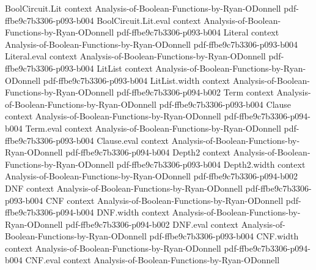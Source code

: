 \begin{lemma}
\leanok
{}
\proofstep
  {BoolCircuit.Lit}
  {context}
  {Analysis-of-Boolean-Functions-by-Ryan-ODonnell}
  {pdf-ffbe9c7b3306-p093-b004}
\proofstep
  {BoolCircuit.Lit.eval}
  {context}
  {Analysis-of-Boolean-Functions-by-Ryan-ODonnell}
  {pdf-ffbe9c7b3306-p093-b004}
\proofstep
  {Literal}
  {context}
  {Analysis-of-Boolean-Functions-by-Ryan-ODonnell}
  {pdf-ffbe9c7b3306-p093-b004}
\proofstep
  {Literal.eval}
  {context}
  {Analysis-of-Boolean-Functions-by-Ryan-ODonnell}
  {pdf-ffbe9c7b3306-p093-b004}
\proofstep
  {LitList}
  {context}
  {Analysis-of-Boolean-Functions-by-Ryan-ODonnell}
  {pdf-ffbe9c7b3306-p093-b004}
\proofstep
  {LitList.width}
  {context}
  {Analysis-of-Boolean-Functions-by-Ryan-ODonnell}
  {pdf-ffbe9c7b3306-p094-b002}
\proofstep
  {Term}
  {context}
  {Analysis-of-Boolean-Functions-by-Ryan-ODonnell}
  {pdf-ffbe9c7b3306-p093-b004}
\proofstep
  {Clause}
  {context}
  {Analysis-of-Boolean-Functions-by-Ryan-ODonnell}
  {pdf-ffbe9c7b3306-p094-b004}
\proofstep
  {Term.eval}
  {context}
  {Analysis-of-Boolean-Functions-by-Ryan-ODonnell}
  {pdf-ffbe9c7b3306-p093-b004}
\proofstep
  {Clause.eval}
  {context}
  {Analysis-of-Boolean-Functions-by-Ryan-ODonnell}
  {pdf-ffbe9c7b3306-p094-b004}
\proofstep
  {Depth2}
  {context}
  {Analysis-of-Boolean-Functions-by-Ryan-ODonnell}
  {pdf-ffbe9c7b3306-p093-b004}
\proofstep
  {Depth2.width}
  {context}
  {Analysis-of-Boolean-Functions-by-Ryan-ODonnell}
  {pdf-ffbe9c7b3306-p094-b002}
\proofstep
  {DNF}
  {context}
  {Analysis-of-Boolean-Functions-by-Ryan-ODonnell}
  {pdf-ffbe9c7b3306-p093-b004}
\proofstep
  {CNF}
  {context}
  {Analysis-of-Boolean-Functions-by-Ryan-ODonnell}
  {pdf-ffbe9c7b3306-p094-b004}
\proofstep
  {DNF.width}
  {context}
  {Analysis-of-Boolean-Functions-by-Ryan-ODonnell}
  {pdf-ffbe9c7b3306-p094-b002}
\proofstep
  {DNF.eval}
  {context}
  {Analysis-of-Boolean-Functions-by-Ryan-ODonnell}
  {pdf-ffbe9c7b3306-p093-b004}
\proofstep
  {CNF.width}
  {context}
  {Analysis-of-Boolean-Functions-by-Ryan-ODonnell}
  {pdf-ffbe9c7b3306-p094-b004}
\proofstep
  {CNF.eval}
  {context}
  {Analysis-of-Boolean-Functions-by-Ryan-ODonnell}

\end{lemma}
